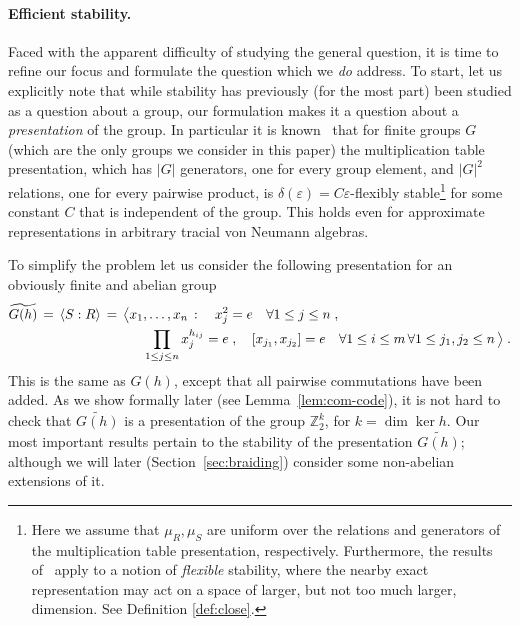 \documentclass[11pt]{article}
\theoremstyle{definition}
\newcommand{\Z}{\ensuremath{\mathbb{Z}}}
\newcommand{\eps}{\varepsilon}
\begin{document}
\paragraph{Efficient stability.}
Faced with the apparent difficulty of studying the general question, it is time to refine our focus and formulate the question which we \emph{do} address. To start, let us explicitly note that 
while stability has previously (for the most part) been studied as a question about a group, our formulation makes it a question about a \emph{presentation} of the group. In particular it is known~\cite{gowers2017inverse,de2019operator} that for finite groups $G$ (which are the only groups we consider in this paper) the multiplication table presentation, which has $|G|$ generators, one  for every group element, and $|G|^2$ relations, one for every pairwise product, is $\delta(\eps)=C\eps$-flexibly stable\footnote{Here we assume that $\mu_R,\mu_S$ are uniform over the relations and generators of the multiplication table presentation, respectively. Furthermore, the results of~\cite{gowers2017inverse,de2019operator} apply to a notion of \emph{flexible} stability, where the nearby exact representation may act on a space of larger, but not too much larger, dimension. See  Definition \ref{def:close}.} for some constant $C$ that is independent of the group. This holds even for approximate representations in arbitrary tracial von Neumann algebras. 

To simplify the problem let us consider the following presentation for an obviously finite and abelian group
\begin{align}
  \widetilde{G(h)} \,=\, \langle S:R\rangle \,=\, \big\langle &x_1,\ldots,x_n \,:\quad  x_j^2=e\quad \forall 1\leq j\leq n\;,\notag\\
 & \quad \prod_{1\leq j \leq n} x_j^{h_{ij}} = e\;,\quad [x_{j_1},x_{j_2}]=e\quad \forall 1\leq i\leq m\,\forall 1\leq j_1,j_2\leq n\,\big\rangle\;.\label{eq:wtgh-intro}
 \end{align}
This is the same as $G(h)$, except that all pairwise commutations have been added. As we show formally later (see Lemma~\ref{lem:com-code}), it is not hard to check that $\widetilde{G(h)}$ is a presentation of the group $\Z_2^k$, for $k=\dim\ker h$. Our most important results pertain to the stability of the presentation $\widetilde{G(h)}$; although we will later (Section~\ref{sec:braiding}) consider some non-abelian extensions of it. 

\newcommand{\wtG}{\widetilde{G(h)}}
\end{document}
